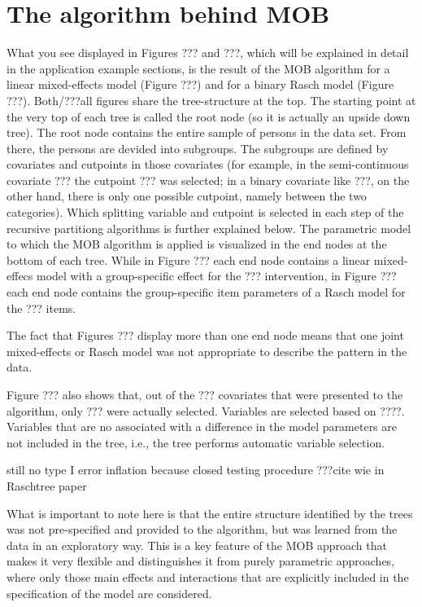 \documentclass[doc,floatsintext,natbib]{apa7}
\begin{document}
\section{The algorithm behind MOB}

What you see displayed in Figures ??? and ???, which will be explained in detail in the application example sections, is the result of the MOB algorithm for a linear mixed-effects model (Figure ???) and for a binary Rasch model (Figure ???). Both/???all figures share the tree-structure at the top. The starting point at the very top of each tree is called the root node (so it is actually an upside down tree). The root node contains the entire sample of persons in the data set. From there, the persons are devided into subgroups. The subgroups are defined by covariates and cutpoints in those covariates (for example, in the semi-continuous covariate ???  the cutpoint ??? was selected; in a binary covariate like ???, on the other hand, there is only one possible cutpoint, namely between the two categories). Which splitting variable and cutpoint is selected in each step of the recursive partitiong algorithms is further explained below. The parametric model to which the MOB algorithm is applied is visualized in the end nodes at the bottom of each tree. While in Figure ??? each end node contains a linear mixed-effecs model with a group-specific effect for the ??? intervention, in Figure ??? each end node contains the group-specific item parameters of a Rasch model for the ??? items. 

The fact that Figures ??? display more than one end node means that one joint mixed-effects or Rasch model was not appropriate to describe the pattern in the data. 

Figure ??? also shows that, out of the ??? covariates that were presented to the algorithm, only ??? were actually selected. Variables are selected based on ????. Variables that are no associated with a difference in the model parameters are not included in the tree, i.e., the tree performs automatic variable selection. 

still no type I error inflation because closed testing procedure ???cite wie in Raschtree paper 


What is important to note here is that the entire structure identified by the trees was not pre-specified and provided to the algorithm, but was learned from the data in an exploratory way. This is a key feature of the MOB approach that makes it very flexible and distinguishes it from purely parametric approaches, where only those main effects and interactions that are explicitly included in the specification of the model are considered.
\end{document}
